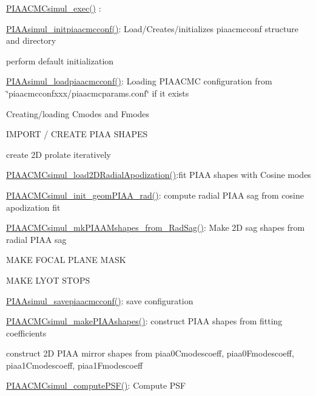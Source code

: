 \begin{DoxyItemize}
\item \hyperlink{PIAACMCsimul_8c_a1083c078214e43d74447950f8a236c5d}{P\+I\+A\+A\+C\+M\+Csimul\+\_\+exec()} \+:
\begin{DoxyItemize}
\item \hyperlink{PIAACMCsimul_8c_a85f1459cf776292b7e2fff9932a79252}{P\+I\+A\+Asimul\+\_\+initpiaacmcconf()}\+: Load/\+Creates/initializes piaacmcconf structure and directory
\begin{DoxyItemize}
\item perform default initialization
\item \hyperlink{PIAACMCsimul_8c_adedec73128f41e8b3f83796bf913c8da}{P\+I\+A\+Asimul\+\_\+loadpiaacmcconf()}\+: Loading P\+I\+A\+A\+C\+M\+C configuration from \char`\"{}piaacmcconfxxx/piaacmcparams.\+conf\char`\"{} if it exists
\item Creating/loading Cmodes and Fmodes
\item I\+M\+P\+O\+R\+T / C\+R\+E\+A\+T\+E P\+I\+A\+A S\+H\+A\+P\+E\+S
\begin{DoxyItemize}
\item create 2\+D prolate iteratively
\item \hyperlink{PIAACMCsimul_8c_a6828d3577dee2b0882bd7df99602f30d}{P\+I\+A\+A\+C\+M\+Csimul\+\_\+load2\+D\+Radial\+Apodization()}\+:fit P\+I\+A\+A shapes with Cosine modes
\item \hyperlink{PIAACMCsimul_8c_a8e2b36e622c11627571989ab113d85eb}{P\+I\+A\+A\+C\+M\+Csimul\+\_\+init\+\_\+geom\+P\+I\+A\+A\+\_\+rad()}\+: compute radial P\+I\+A\+A sag from cosine apodization fit
\item \hyperlink{PIAACMCsimul_8c_adad6ba0da7cd47c07c35232b6096fa1c}{P\+I\+A\+A\+C\+M\+Csimul\+\_\+mk\+P\+I\+A\+A\+Mshapes\+\_\+from\+\_\+\+Rad\+Sag()}\+: Make 2\+D sag shapes from radial P\+I\+A\+A sag
\end{DoxyItemize}
\item M\+A\+K\+E F\+O\+C\+A\+L P\+L\+A\+N\+E M\+A\+S\+K
\item M\+A\+K\+E L\+Y\+O\+T S\+T\+O\+P\+S
\item \hyperlink{PIAACMCsimul_8c_aac928f8658448934caa7e805af8606a8}{P\+I\+A\+Asimul\+\_\+savepiaacmcconf()}\+: save configuration
\end{DoxyItemize}
\item \hyperlink{PIAACMCsimul_8c_a0ae7439a20fe5267506bc7d1e0533f08}{P\+I\+A\+A\+C\+M\+Csimul\+\_\+make\+P\+I\+A\+Ashapes()}\+: construct P\+I\+A\+A shapes from fitting coefficients
\begin{DoxyItemize}
\item construct 2\+D P\+I\+A\+A mirror shapes from piaa0\+Cmodescoeff, piaa0\+Fmodescoeff, piaa1\+Cmodescoeff, piaa1\+Fmodescoeff
\end{DoxyItemize}
\item \hyperlink{PIAACMCsimul_8c_a0650545f10bc1e359093510f12a9f9f6}{P\+I\+A\+A\+C\+M\+Csimul\+\_\+compute\+P\+S\+F()}\+: Compute P\+S\+F
\end{DoxyItemize}
\end{DoxyItemize}

